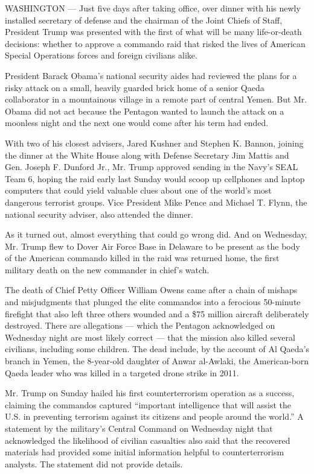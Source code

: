 WASHINGTON --- Just five days after taking office, over dinner with his
newly installed secretary of defense and the chairman of the Joint
Chiefs of Staff, President Trump was presented with the first of what
will be many life-or-death decisions: whether to approve a commando raid
that risked the lives of American Special Operations forces and foreign
civilians alike.

President Barack Obama's national security aides had reviewed the plans
for a risky attack on a small, heavily guarded brick home of a senior
Qaeda collaborator in a mountainous village in a remote part of central
Yemen. But Mr. Obama did not act because the Pentagon wanted to launch
the attack on a moonless night and the next one would come after his
term had ended.

With two of his closest advisers, Jared Kushner and Stephen K. Bannon,
joining the dinner at the White House along with Defense Secretary Jim
Mattis and Gen. Joseph F. Dunford Jr., Mr. Trump approved sending in the
Navy's SEAL Team 6, hoping the raid early last Sunday would scoop up
cellphones and laptop computers that could yield valuable clues about
one of the world's most dangerous terrorist groups. Vice President Mike
Pence and Michael T. Flynn, the national security adviser, also attended
the dinner.

As it turned out, almost everything that could go wrong did. And on
Wednesday, Mr. Trump flew to Dover Air Force Base in Delaware to be
present as the body of the American commando killed in the raid was
returned home, the first military death on the new commander in chief's
watch.

The death of Chief Petty Officer William Owens came after a chain of
mishaps and misjudgments that plunged the elite commandos into a
ferocious 50-minute firefight that also left three others wounded and a
\$75 million aircraft deliberately destroyed. There are allegations ---
which the Pentagon acknowledged on Wednesday night are most likely
correct --- that the mission also killed several civilians, including
some children. The dead include, by the account of Al Qaeda's branch in
Yemen, the 8-year-old daughter of Anwar al-Awlaki, the American-born
Qaeda leader who was killed in a targeted drone strike in 2011.

Mr. Trump on Sunday hailed his first counterterrorism operation as a
success, claiming the commandos captured ``important intelligence that
will assist the U.S. in preventing terrorism against its citizens and
people around the world.'' A statement by the military's Central Command
on Wednesday night that acknowledged the likelihood of civilian
casualties also said that the recovered materials had provided some
initial information helpful to counterterrorism analysts. The statement
did not provide details.

